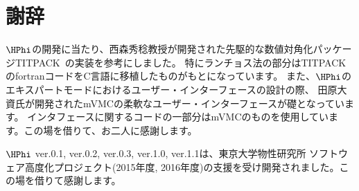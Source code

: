 \chapter{謝辞}
\label{Ch:ack}
$\HPhi$の開発に当たり、西森秀稔教授が開発された先駆的な数値対角化パッケージTITPACK~\cite{titpack}の実装を参考にしました。
特にランチョス法の部分はTITPACKのfortranコードをC言語に移植したものがもとになっています。
また、$\HPhi$のエキスパートモードにおけるユーザー・インターフェースの設計の際、
田原大資氏が開発されたmVMCの柔軟なユーザー・インターフェースが礎となっています。
インタフェースに関するコードの一部分はmVMCのものを使用しています。この場を借りて、お二人に感謝します。

$\HPhi$ ver.0.1, ver.0.2, ver.0.3, ver.1.0, ver.1.1は、東京大学物性研究所 ソフトウェア高度化プロジェクト(2015年度, 2016年度)の支援を受け開発されました。この場を借りて感謝します。
